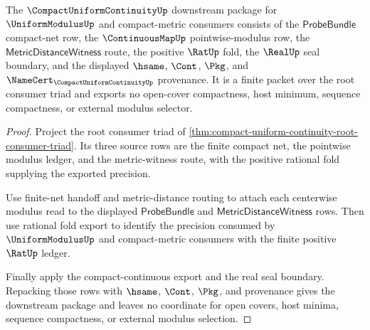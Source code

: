 \begin{theorem}
\label{thm:compact-uniform-continuity-root-downstream-unblock-package}
The $\CompactUniformContinuityUp$ downstream package for $\UniformModulusUp$ and compact-metric consumers consists of the $\mathsf{ProbeBundle}$ compact-net row, the $\ContinuousMapUp$ pointwise-modulus row, the $\mathsf{MetricDistanceWitness}$ route, the positive $\RatUp$ fold, the $\RealUp$ seal boundary, and the displayed $\hsame$, $\Cont$, $\Pkg$, and $\NameCert_{\CompactUniformContinuityUp}$ provenance. It is a finite packet over the root consumer triad and exports no open-cover compactness, host minimum, sequence compactness, or external modulus selector.
\end{theorem}
\begin{proof}
Project the root consumer triad of \autoref{thm:compact-uniform-continuity-root-consumer-triad}. Its three source rows are the finite compact net, the pointwise modulus ledger, and the metric-witness route, with the positive rational fold supplying the exported precision.

Use finite-net handoff and metric-distance routing to attach each centerwise modulus read to the displayed $\mathsf{ProbeBundle}$ and $\mathsf{MetricDistanceWitness}$ rows. Then use rational fold export to identify the precision consumed by $\UniformModulusUp$ and compact-metric consumers with the finite positive $\RatUp$ ledger.

Finally apply the compact-continuous \NameCert{} export and the real seal boundary. Repacking those rows with $\hsame$, $\Cont$, $\Pkg$, and \NameCert{} provenance gives the downstream package and leaves no coordinate for open covers, host minima, sequence compactness, or external modulus selection.
\end{proof}

